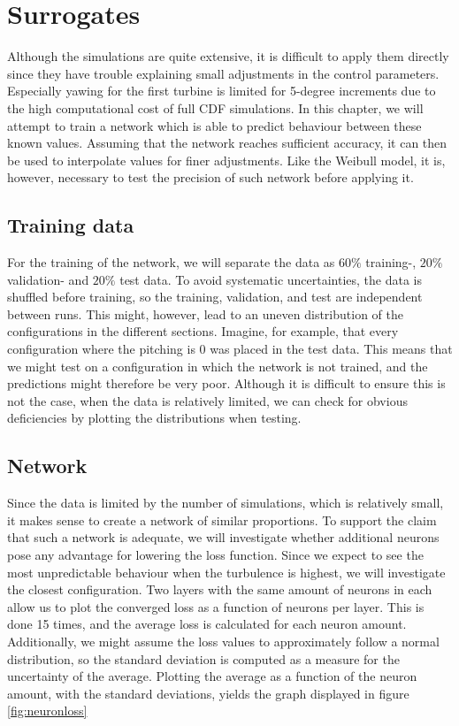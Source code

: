\chapter{Surrogates}
\label{Surrogates}

Although the simulations are quite extensive, it is difficult to apply them directly since they have trouble explaining small adjustments in the control parameters. Especially yawing for the first turbine is limited for 5-degree increments due to the high computational cost of full CDF simulations. In this chapter, we will attempt to train a network which is able to predict behaviour between these known values. Assuming that the network reaches sufficient accuracy, it can then be used to interpolate values for finer adjustments. Like the Weibull model, it is, however, necessary to test the precision of such network before applying it. 


\section{Training data}
\label{trainingdata}

For the training of the network, we will separate the data as $60\%$ training-, $20\%$ validation- and $20\%$ test data. To avoid systematic uncertainties, the data is shuffled before training, so the training, validation, and test are independent between runs. This might, however, lead to an uneven distribution of the configurations in the different sections. Imagine, for example, that every configuration where the pitching is 0 was placed in the test data. This means that we might test on a configuration in which the network is not trained, and the predictions might therefore be very poor. Although it is difficult to ensure this is not the case, when the data is relatively limited, we can check for obvious deficiencies by plotting the distributions when testing. 


\section{Network}

Since the data is limited by the number of simulations, which is relatively small, it makes sense to create a network of similar proportions. To support the claim that such a network is adequate, we will investigate whether additional neurons pose any advantage for lowering the loss function. Since we expect to see the most unpredictable behaviour when the turbulence is highest, we will investigate the closest configuration. Two layers with the same amount of neurons in each allow us to plot the converged loss as a function of neurons per layer. This is done 15 times, and the average loss is calculated for each neuron amount. Additionally, we might assume the loss values to approximately follow a normal distribution, so the standard deviation is computed as a measure for the uncertainty of the average. Plotting the average as a function of the neuron amount, with the standard deviations, yields the graph displayed in figure \ref{fig:neuronloss}

